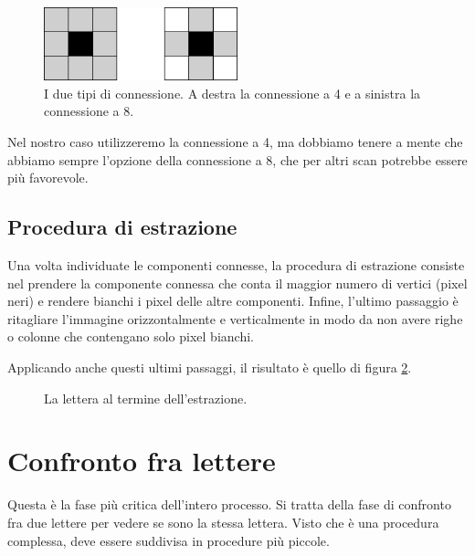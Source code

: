 \begin{figure}
    \centering
    \includegraphics[width=0.5\textwidth]{figures/Sasiedztwa_4_8.png}
    \caption{I due tipi di connessione. A destra la connessione a 4 e a sinistra la connessione a 8.}
    \label{fig:connectivity}
\end{figure}

Nel nostro caso utilizzeremo la connessione a 4, ma dobbiamo tenere a mente che abbiamo sempre l'opzione della connessione a 8, che per altri scan potrebbe essere pi\`u favorevole.

\subsection{Procedura di estrazione}

Una volta individuate le componenti connesse, la procedura di estrazione consiste nel prendere la componente connessa che conta il maggior numero di vertici (pixel neri) e rendere bianchi i pixel delle altre componenti. Infine, l'ultimo passaggio \`e ritagliare l'immagine orizzontalmente e verticalmente in modo da non avere righe o colonne che contengano solo pixel bianchi.

Applicando anche questi ultimi passaggi, il risultato \`e quello di figura \ref{fig:polished_letter}.

\begin{figure}
    \centering
    \caption{La lettera al termine dell'estrazione.}
    \label{fig:polished_letter}
\end{figure}

\section{Confronto fra lettere}

Questa \`e la fase pi\`u critica dell'intero processo. Si tratta della fase di confronto fra due lettere per vedere se sono la stessa lettera. Visto che \`e una procedura complessa, deve essere suddivisa in procedure pi\`u piccole.

